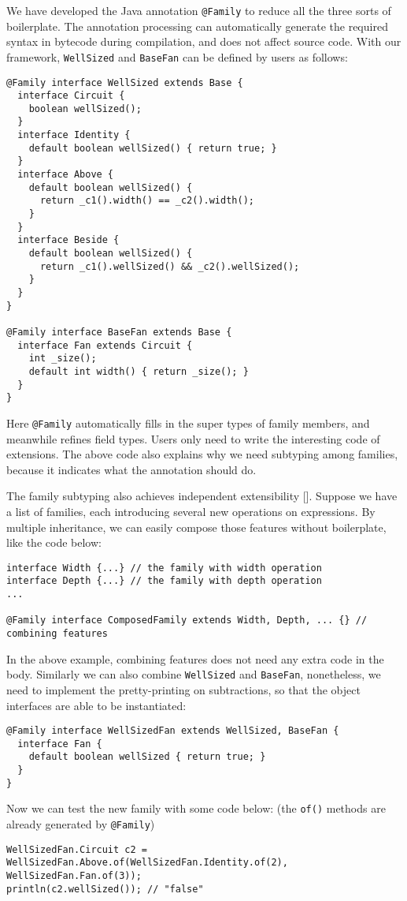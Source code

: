 We have developed the Java annotation \lstinline|@Family| to reduce all the three sorts of boilerplate. The annotation processing can automatically
generate the required syntax in bytecode during compilation, and does not affect source code. With our framework, \lstinline|WellSized|
and \lstinline|BaseFan| can be defined by users as follows:
\begin{lstlisting}
@Family interface WellSized extends Base {
  interface Circuit {
    boolean wellSized();
  }
  interface Identity {
    default boolean wellSized() { return true; }
  }
  interface Above {
    default boolean wellSized() {
      return _c1().width() == _c2().width();
    }
  }
  interface Beside {
    default boolean wellSized() {
      return _c1().wellSized() && _c2().wellSized();
    }
  }
}

@Family interface BaseFan extends Base {
  interface Fan extends Circuit {
    int _size();
    default int width() { return _size(); }
  }
}
\end{lstlisting}
Here \lstinline|@Family| automatically fills in the super types of family members, and meanwhile
refines field types. Users only need to write the interesting code of extensions. The above code
also explains why we need subtyping among families, because it indicates what the annotation should do.

The family subtyping also achieves independent extensibility []. Suppose we have a list of families,
each introducing several new operations on expressions. By multiple inheritance, we can easily compose
those features without boilerplate, like the code below:
\begin{lstlisting}
interface Width {...} // the family with width operation
interface Depth {...} // the family with depth operation
...

@Family interface ComposedFamily extends Width, Depth, ... {} // combining features
\end{lstlisting}

In the above example, combining features does not need any extra code in the body. Similarly we can also
combine \lstinline|WellSized| and \lstinline|BaseFan|, nonetheless, we need to implement the
pretty-printing on subtractions, so that the object interfaces are able to be instantiated:
\begin{lstlisting}
@Family interface WellSizedFan extends WellSized, BaseFan {
  interface Fan {
    default boolean wellSized { return true; }
  }
}
\end{lstlisting}
Now we can test the new family with some code below: (the \lstinline|of()| methods are already generated by \lstinline|@Family|)
\begin{lstlisting}
WellSizedFan.Circuit c2 = WellSizedFan.Above.of(WellSizedFan.Identity.of(2), WellSizedFan.Fan.of(3));
println(c2.wellSized()); // "false"
\end{lstlisting}

